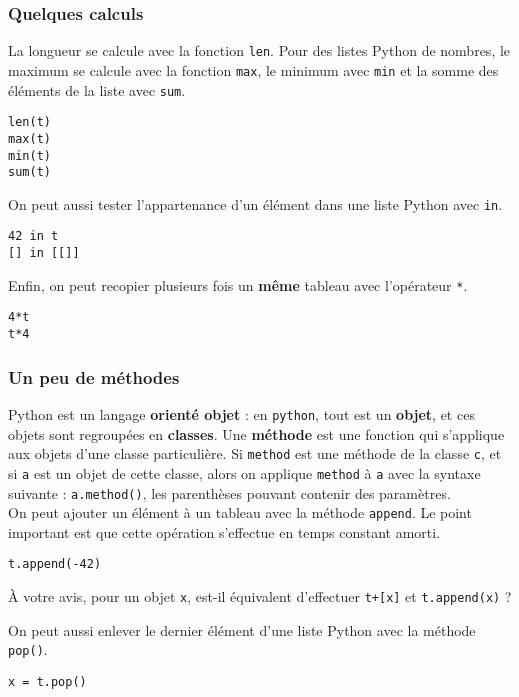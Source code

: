 \subsubsection{Quelques calculs}
La longueur se calcule avec la fonction \texttt{len}. Pour des listes Python de nombres, le maximum 
se calcule avec la fonction \texttt{max}, le minimum avec \texttt{min} et la somme des éléments de la 
liste avec \texttt{sum}.
\begin{lstlisting}
len(t)
max(t)
min(t)
sum(t)
\end{lstlisting}

On peut aussi tester l'appartenance d'un élément dans une liste Python avec \texttt{in}.

\begin{lstlisting}
42 in t
[] in [[]]
\end{lstlisting}

Enfin, on peut recopier plusieurs fois un \textbf{même} tableau avec l'opérateur \texttt{*}.

\begin{lstlisting}
4*t
t*4
\end{lstlisting}




\subsubsection{Un peu de méthodes}
Python est un langage \textbf{orienté objet} : en \texttt{python}, tout est un \textbf{objet}, et ces objets 
sont regroupées en \textbf{classes}. Une \textbf{méthode} est une fonction qui s'applique aux objets 
d'une classe particulière. Si \texttt{method} est une méthode de la classe \texttt{c}, et si 
\texttt{a} est un objet de cette classe, alors on applique \texttt{method} à \texttt{a} avec la 
syntaxe suivante : \texttt{a.method()}, les parenthèses pouvant contenir des paramètres.\\

On peut ajouter un élément à un tableau avec la méthode \texttt{append}. Le point important est que 
cette opération s'effectue en temps constant amorti.
\begin{lstlisting}
t.append(-42)
\end{lstlisting}
\`A votre avis, pour un objet \texttt{x}, est-il équivalent d'effectuer \texttt{t+[x]} et \texttt{t.append(x)} ?

On peut aussi enlever le dernier élément d'une liste Python avec la méthode \texttt{pop()}.
\begin{lstlisting}
x = t.pop()
\end{lstlisting}

